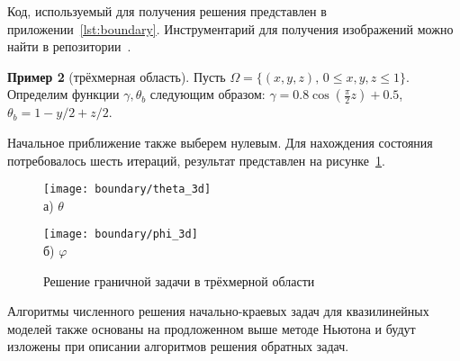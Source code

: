 Код, используемый для получения решения представлен в приложении~\ref{lst:boundary}.
Инструментарий для получения изображений можно найти в репозитории~\cite{mesenev-github}.

\textbf{Пример 2} (трёхмерная область).
Пусть $\Omega=\{(x,y,z),\, 0 \leq x,y,z \leq 1 \}$.
Определим функции $\gamma, \theta_b$ следующим образом:
$\gamma = 0.8 \cos\left(\frac{\pi}{2} z\right) + 0.5$,
$\theta_b = 1- y / 2 + z /2$.

Начальное приближение также выберем нулевым.
Для нахождения состояния потребовалось шесть итераций,
результат представлен на рисунке~\ref{fig:4_1:boundary_3d}.
\begin{figure}[h!t]
    \begin{minipage}[b][][b]{0.49\linewidth}
        \centering
        \texttt{[image: boundary/theta\_3d]} \\ а) $\theta$
    \end{minipage}
    \hfill
    \begin{minipage}[b][][b]{0.49\linewidth}
        \centering
        \texttt{[image: boundary/phi\_3d]} \\ б) $\varphi$
    \end{minipage}
    \caption{Решение граничной задачи в трёхмерной области}
    \label{fig:4_1:boundary_3d}
\end{figure}

\begin{remark}
    Алгоритмы численного решения начально-краевых задач для квазилинейных моделей
    также основаны на продложенном выше методе Ньютона и будут изложены при описании
    алгоритмов решения обратных задач.
\end{remark}

